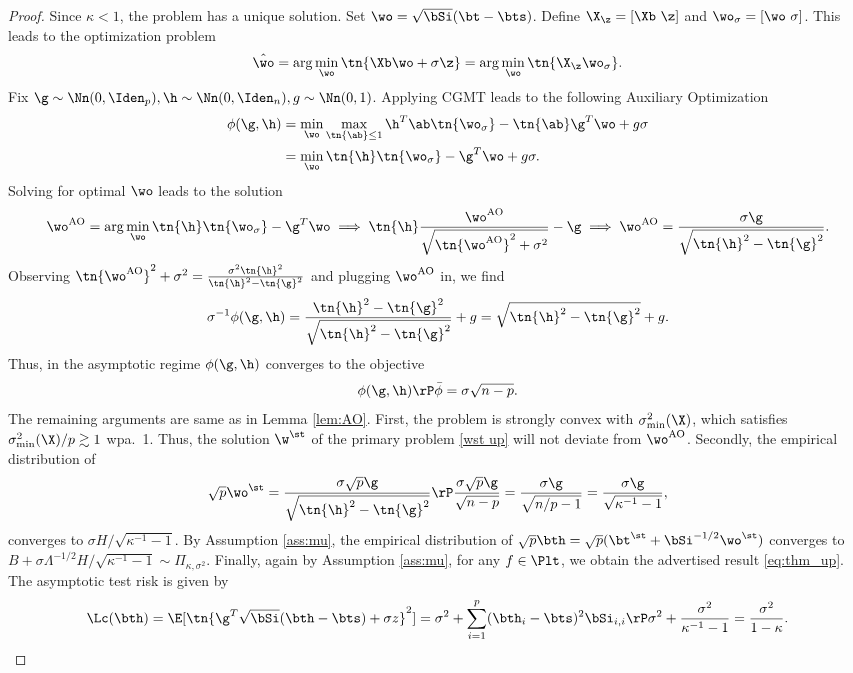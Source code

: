 \begin{proof}  

Since $\kappa<1$, the problem has a unique solution. Set $\wo=\sqrt{\bSi}(\bt-\bts)$. Define $\X_\z=[\Xb~\z]$ and $\wo_\sigma=[\wo~\sigma]$. This leads to the optimization problem
\[
\hat{\wo}=\arg\min_{\wo} \tn{\Xb\wo+\sigma \z}=\arg\min_{\wo} \tn{\X_\z\wo_\sigma}.
\]
Fix $\g\sim\Nn(0,\Iden_p),\h\sim\Nn(0,\Iden_n),g\sim\Nn(0,1)$. Applying CGMT leads to the following Auxiliary Optimization%
\begin{align}
\phi(\g,\h)&=\min_{\wo} \max_{\tn{\ab}\leq 1} \h^T\ab \tn{\wo_{\sigma}}-\tn{\ab}\g^T\wo+g\sigma\\
&=\min_{\wo}  \tn{\h} \tn{\wo_{\sigma}}-\g^T\wo+g\sigma.
\end{align}
Solving for optimal $\wo$ leads to the solution
\[
\wo^{\text{AO}}=\arg\min_{\wo}\tn{\h} \tn{\wo_{\sigma}}-\g^T\wo\implies \tn{\h}\frac{\wo^{\text{AO}}}{\sqrt{\tn{\wo^{\text{AO}}}^2+\sigma^2}}-\g\implies \wo^{\text{AO}}=\frac{\sigma\g}{\sqrt{\tn{\h}^2-\tn{\g}^2}}.
\]
Observing $\tn{\wo^{\text{AO}}}^2+\sigma^2=\frac{\sigma^2\tn{\h}^2}{\tn{\h}^2-\tn{\g}^2}$ and plugging $\wo^{\text{AO}}$ in, we find
\[
\sigma^{-1}\phi(\g,\h)=\frac{\tn{\h}^2-\tn{\g}^2}{\sqrt{\tn{\h}^2-\tn{\g}^2}}+g=\sqrt{\tn{\h}^2-\tn{\g}^2}+g.
\]
Thus, in the asymptotic regime $\phi(\g,\h)$ converges to the objective%
\[
\phi(\g,\h)\rP \bar{\phi}=\sigma\sqrt{n-p}.
\]
The remaining arguments are same as in Lemma \ref{lem:AO}. First, the problem is strongly convex with $\sigma^2_{\min}(\X)$, which satisfies $\sigma^2_{\min}(\X)/p\gtrsim 1$ wpa.~1. Thus, the solution $\w^\st$ of the primary problem \eqref{wst up} will not deviate from $\wo^{\text{AO}}$. Secondly, the empirical distribution of 
\[
\sqrt{p}\wo^\st=\frac{\sigma\sqrt{p}\g}{\sqrt{\tn{\h}^2-\tn{\g}^2}}\rP \frac{\sigma\sqrt{p}\g}{\sqrt{n-p}}= \frac{\sigma\g}{\sqrt{n/p-1}}=\frac{\sigma\g}{\sqrt{\kappa^{-1}-1}},
\]
converges to $\sigma H/\sqrt{\kappa^{-1}-1}$. By Assumption \ref{ass:mu}, the empirical distribution of $\sqrt{p}\bth=\sqrt{p}(\bt^\st+\bSi^{-1/2}\wo^\st)$ converges to $B+\sigma \Lambda^{-1/2}H/\sqrt{\kappa^{-1}-1}\sim \Pi_{\kappa,\sigma^2}$. Finally, again by Assumption \ref{ass:mu}, for any $f\in \Plt$, we obtain the advertised result \eqref{eq:thm_up}. The asymptotic test risk is given by
\[
\Lc(\bth)=\E[\tn{\g^T\sqrt{\bSi}(\bth-\bts)+\sigma z}^2]=\sigma^2+\sum_{i=1}^p (\bth_i-\bts)^2\bSi_{i,i}\rP\sigma^2+\frac{\sigma^2}{\kappa^{-1}-1}=\frac{\sigma^2}{1-\kappa}.
\]
\end{proof}

